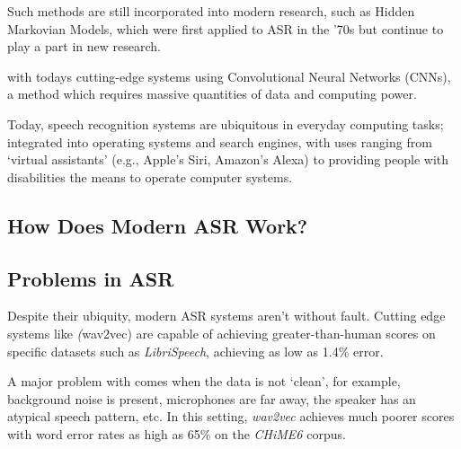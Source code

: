 Such methods are still incorporated into modern research, such as Hidden Markovian Models, which were first applied to ASR in the '70s\cite{baker1975stochastic} but continue to play a part in new research\cite{hmm2023,bengio1999markovian}.


with todays cutting-edge systems using Convolutional Neural Networks (CNNs)\cite{whisper,wav2vec2,bigssl,chung2021}, a method which requires massive quantities of data and computing power.

Today, speech recognition systems are ubiquitous in everyday computing tasks; 
integrated into operating systems and search engines, with uses ranging from `virtual assistants' (e.g., Apple's Siri, Amazon's Alexa) to providing people with disabilities the means to operate computer systems.

\subsection{How Does Modern ASR Work?}

\subsection{Problems in ASR}

Despite their ubiquity, modern ASR systems aren't without fault.
Cutting edge systems like \emph(wav2vec) are capable of achieving greater-than-human scores on specific datasets\cite{wav2vec2,bigssl,chung2021} such as \emph{LibriSpeech}\cite{librispeech}, achieving as low as 1.4\% error\cite{zhang2020}.

A major problem with comes when the data is not `clean', for example, background noise is present, microphones are far away, the speaker has an atypical speech pattern, etc. 
In this setting, \emph{wav2vec} achieves much poorer scores with word error rates as high as 65\%\cite{whisper} on the \emph{CHiME6} corpus\cite{chime6}.


